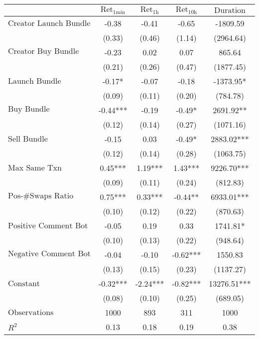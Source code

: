\begin{tabular}{lcccc}
\hline
 & $\text{Ret}_{\text{1min}}$ & $\text{Ret}_{\text{1h}}$ & $\text{Ret}_{\text{10h}}$ & $\text{Duration}$ \\
\hline
$\text{Creator Launch Bundle}$ & -0.38 & -0.41 & -0.65 & -1809.59 \\
 & (0.33) & (0.46) & (1.14) & (2964.64) \\
$\text{Creator Buy Bundle}$ & -0.23 & 0.02 & 0.07 & 865.64 \\
 & (0.21) & (0.26) & (0.47) & (1877.45) \\
$\text{Launch Bundle}$ & -0.17* & -0.07 & -0.18 & -1373.95* \\
 & (0.09) & (0.11) & (0.20) & (784.78) \\
$\text{Buy Bundle}$ & -0.44*** & -0.19 & -0.49* & 2691.92** \\
 & (0.12) & (0.14) & (0.27) & (1071.16) \\
$\text{Sell Bundle}$ & -0.15 & 0.03 & -0.49* & 2883.02*** \\
 & (0.12) & (0.14) & (0.28) & (1063.75) \\
$\text{Max Same Txn}$ & 0.45*** & 1.19*** & 1.43*** & 9226.70*** \\
 & (0.09) & (0.11) & (0.24) & (812.83) \\
$\text{Pos-\#Swaps Ratio}$ & 0.75*** & 0.33*** & -0.44** & 6933.01*** \\
 & (0.10) & (0.12) & (0.22) & (870.63) \\
$\text{Positive Comment Bot}$ & -0.05 & 0.19 & 0.33 & 1741.81* \\
 & (0.10) & (0.13) & (0.22) & (948.64) \\
$\text{Negative Comment Bot}$ & -0.04 & -0.10 & -0.62*** & 1550.83 \\
 & (0.13) & (0.15) & (0.23) & (1137.27) \\
$\text{Constant}$ & -0.32*** & -2.24*** & -0.82*** & 13276.51*** \\
 & (0.08) & (0.10) & (0.25) & (689.05) \\
$\text{Observations}$ & 1000 & 893 & 311 & 1000 \\
$R^2$ & 0.13 & 0.18 & 0.19 & 0.38 \\
\hline
\end{tabular}